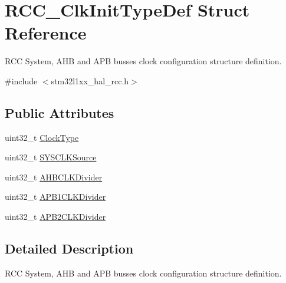 \hypertarget{struct_r_c_c___clk_init_type_def}{\section{R\-C\-C\-\_\-\-Clk\-Init\-Type\-Def Struct Reference}
\label{struct_r_c_c___clk_init_type_def}
}


R\-C\-C System, A\-H\-B and A\-P\-B busses clock configuration structure definition.  




{\ttfamily \#include $<$stm32l1xx\-\_\-hal\-\_\-rcc.\-h$>$}

\subsection*{Public Attributes}
\begin{DoxyCompactItemize}
\item 
uint32\-\_\-t \hyperlink{struct_r_c_c___clk_init_type_def_a93a53676a1cfc5b55b8b990e7ff4dac5}{Clock\-Type}
\item 
uint32\-\_\-t \hyperlink{struct_r_c_c___clk_init_type_def_a4ceff1fdbf423e347c63052ca2c1d7e1}{S\-Y\-S\-C\-L\-K\-Source}
\item 
uint32\-\_\-t \hyperlink{struct_r_c_c___clk_init_type_def_abd9bcaa8dcf4b816462ee2930ab3e993}{A\-H\-B\-C\-L\-K\-Divider}
\item 
uint32\-\_\-t \hyperlink{struct_r_c_c___clk_init_type_def_a21ceb024102adc3c4dc7eb270cf02ebd}{A\-P\-B1\-C\-L\-K\-Divider}
\item 
uint32\-\_\-t \hyperlink{struct_r_c_c___clk_init_type_def_aa75c110cd93855d49249f38da8cf94f7}{A\-P\-B2\-C\-L\-K\-Divider}
\end{DoxyCompactItemize}


\subsection{Detailed Description}
R\-C\-C System, A\-H\-B and A\-P\-B busses clock configuration structure definition. 

